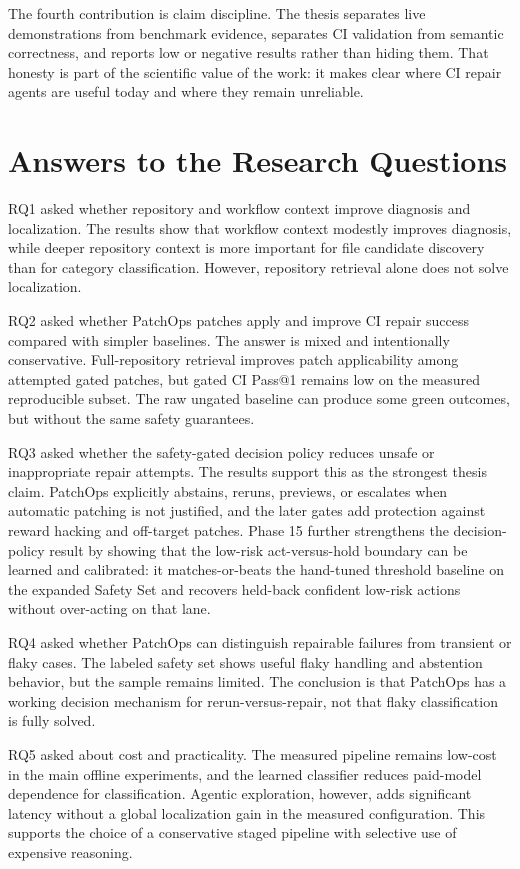 The fourth contribution is claim discipline. The thesis separates live demonstrations from benchmark evidence,
separates CI validation from semantic correctness, and reports low or negative results rather than hiding them.
That honesty is part of the scientific value of the work: it makes clear where CI repair agents are useful
today and where they remain unreliable.

\section{Answers to the Research Questions}

RQ1 asked whether repository and workflow context improve diagnosis and localization. The results show that
workflow context modestly improves diagnosis, while deeper repository context is more important for file
candidate discovery than for category classification. However, repository retrieval alone does not solve
localization.

RQ2 asked whether PatchOps patches apply and improve CI repair success compared with simpler baselines. The
answer is mixed and intentionally conservative. Full-repository retrieval improves patch applicability among
attempted gated patches, but gated CI Pass@1 remains low on the measured reproducible subset. The raw ungated
baseline can produce some green outcomes, but without the same safety guarantees.

RQ3 asked whether the safety-gated decision policy reduces unsafe or inappropriate repair attempts. The results
support this as the strongest thesis claim. PatchOps explicitly abstains, reruns, previews, or escalates when
automatic patching is not justified, and the later gates add protection against reward hacking and off-target
patches. Phase 15 further strengthens the decision-policy result by showing that the low-risk act-versus-hold
boundary can be learned and calibrated: it matches-or-beats the hand-tuned threshold baseline on the expanded
Safety Set and recovers held-back confident low-risk actions without over-acting on that lane.

RQ4 asked whether PatchOps can distinguish repairable failures from transient or flaky cases. The labeled
safety set shows useful flaky handling and abstention behavior, but the sample remains limited. The conclusion
is that PatchOps has a working decision mechanism for rerun-versus-repair, not that flaky classification is
fully solved.

RQ5 asked about cost and practicality. The measured pipeline remains low-cost in the main offline experiments,
and the learned classifier reduces paid-model dependence for classification. Agentic exploration, however,
adds significant latency without a global localization gain in the measured configuration. This supports the
choice of a conservative staged pipeline with selective use of expensive reasoning.

